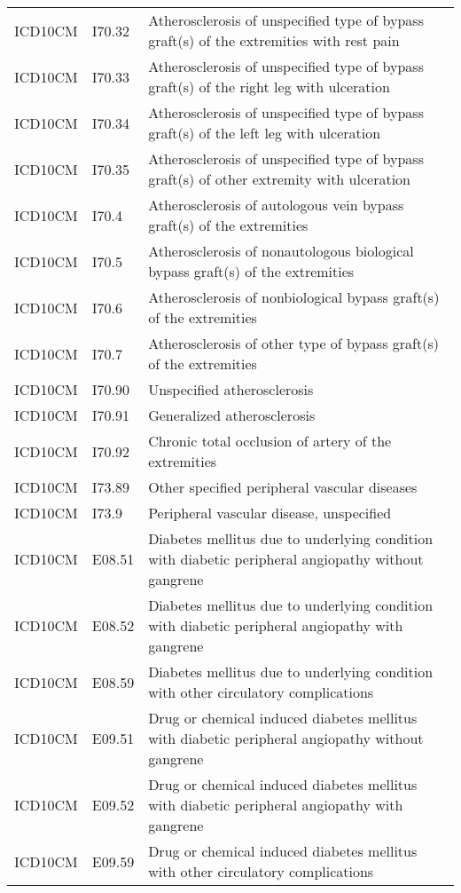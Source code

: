\begin{longtable}{p{}p{}p{}}
  ICD10CM & I70.32 & Atherosclerosis of unspecified type of bypass graft(s) of the extremities with rest pain \\ 
  ICD10CM & I70.33 & Atherosclerosis of unspecified type of bypass graft(s) of the right leg with ulceration \\ 
  ICD10CM & I70.34 & Atherosclerosis of unspecified type of bypass graft(s) of the left leg with ulceration \\ 
  ICD10CM & I70.35 & Atherosclerosis of unspecified type of bypass graft(s) of other extremity with ulceration \\ 
  ICD10CM & I70.4 & Atherosclerosis of autologous vein bypass graft(s) of the extremities \\ 
  ICD10CM & I70.5 & Atherosclerosis of nonautologous biological bypass graft(s) of the extremities \\ 
  ICD10CM & I70.6 & Atherosclerosis of nonbiological bypass graft(s) of the extremities \\ 
  ICD10CM & I70.7 & Atherosclerosis of other type of bypass graft(s) of the extremities \\ 
  ICD10CM & I70.90 & Unspecified atherosclerosis \\ 
  ICD10CM & I70.91 & Generalized atherosclerosis \\ 
  ICD10CM & I70.92 & Chronic total occlusion of artery of the extremities \\ 
  ICD10CM & I73.89 & Other specified peripheral vascular diseases \\ 
  ICD10CM & I73.9 & Peripheral vascular disease, unspecified \\ 
  ICD10CM & E08.51 & Diabetes mellitus due to underlying condition with diabetic peripheral angiopathy without gangrene \\ 
  ICD10CM & E08.52 & Diabetes mellitus due to underlying condition with diabetic peripheral angiopathy with gangrene \\ 
  ICD10CM & E08.59 & Diabetes mellitus due to underlying condition with other circulatory complications \\ 
  ICD10CM & E09.51 & Drug or chemical induced diabetes mellitus with diabetic peripheral angiopathy without gangrene \\ 
  ICD10CM & E09.52 & Drug or chemical induced diabetes mellitus with diabetic peripheral angiopathy with gangrene \\ 
  ICD10CM & E09.59 & Drug or chemical induced diabetes mellitus with other circulatory complications \\ 

\end{longtable}
